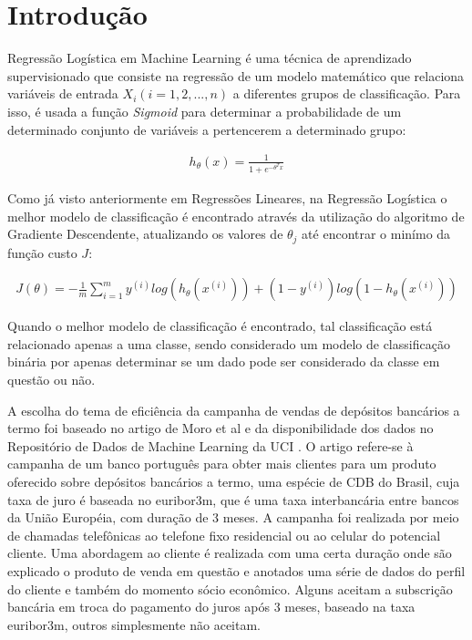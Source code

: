 \documentclass[twoside,conference,a4paper]{IEEEtran}
\begin{document}

\section{Introdução}

Regressão Logística em Machine Learning é uma técnica de aprendizado supervisionado que consiste na regressão de um modelo matemático que relaciona variáveis de entrada $X{_i} (i=1,2,...,n)$ a diferentes grupos de classificação. Para isso, é usada a função \textit{Sigmoid} para determinar a probabilidade de um determinado conjunto de variáveis a pertencerem a determinado grupo:

\begin{ceqn}
\begin{align}
h_{\theta}(x) = \frac{1}{1+e^{-\theta^{T}x}}
\end{align}
\end{ceqn}

Como já visto anteriormente em Regressões Lineares, na Regressão Logística o melhor modelo de classificação é encontrado através da utilização do algoritmo de Gradiente Descendente, atualizando os valores de $\theta{_j}$ até encontrar o minímo da função custo $J$:
	
\begin{ceqn}
\begin{align}
J(\theta) = -\frac{1}{m}\displaystyle\sum_{i=1}^{m}y^{(i)}log(h_{\theta}(x^{(i)})) + (1-y^{(i)})log(1-h_{\theta}(x^{(i)}))
\end{align}
\end{ceqn}

Quando o melhor modelo de classificação é encontrado, tal classificação está relacionado apenas a uma classe, sendo considerado um modelo de classificação binária por apenas determinar se um dado pode ser considerado da classe em questão ou não.

A escolha do tema de eficiência da campanha de vendas de depósitos bancários a termo foi baseado no artigo de Moro et al \cite{Moro:2014} e da disponibilidade dos dados no Repositório de Dados de Machine Learning da UCI \cite{UCI:2014}. O artigo refere-se à campanha de um banco português para obter mais clientes para um produto oferecido sobre depósitos bancários a termo, uma espécie de CDB do Brasil, cuja taxa de juro é baseada no euribor3m, que é uma taxa interbancária entre bancos da União Européia, com duração de 3 meses. A campanha foi realizada por meio de chamadas telefônicas ao telefone fixo residencial ou ao celular do potencial cliente. Uma abordagem ao cliente é realizada com uma certa duração onde são explicado o produto de venda em questão e anotados uma série de dados do perfil do cliente e também do momento sócio econômico. Alguns aceitam a subscrição bancária em troca do pagamento do juros após 3 meses, baseado na taxa euribor3m, outros simplesmente não aceitam. 
\end{document}
